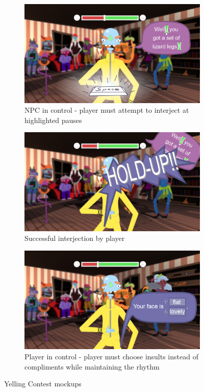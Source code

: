 \begin{figure}[H]
  \centering\begin{subfigure}{.33\textwidth}
    \centering
    \includegraphics[width=.9\linewidth]{images/UI_yelling_defense}
    \caption{NPC in control - player must attempt to interject at highlighted pauses}
    \label{fig:yelling_contest_a}
  \end{subfigure}%
  \begin{subfigure}{.33\textwidth}
    \centering
    \includegraphics[width=.9\linewidth]{images/UI_yelling_interrupt}
    \caption{Successful interjection by player}
    \label{fig:yelling_contest_b}
  \end{subfigure}%
  \begin{subfigure}{.33\textwidth}
    \centering
    \includegraphics[width=.9\linewidth]{images/UI_yelling_offense}
    \caption{Player in control - player must choose insults instead of compliments while maintaining the rhythm}
    \label{fig:yelling_contest_c}
  \end{subfigure}%
  \caption{Yelling Contest mockups}
  \label{fig:yelling_contest}
\end{figure}


